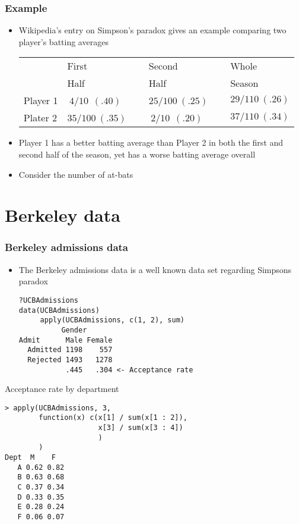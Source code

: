 \documentclass[aspectratio=169]{beamer}
\begin{document}
\begin{frame}\frametitle{Example}
\begin{itemize}
\item Wikipedia's entry on Simpson's paradox gives an example
  comparing two player's batting averages
  \begin{center}
    \ttfamily
    \small
    \begin{tabular}{llll} 
               & First             & Second             & Whole  \\
               & Half              & Half               & Season \\ \hline
      Player 1 & $~4 / 10 ~~(.40)$ ~~& $25 / 100 ~(.25)$ ~~& $29 / 110 ~(.26)$ \\
      Plater 2 & $35 / 100 ~(.35)$ ~~& $~2 / 10~ ~(.20)$ ~~& $37 / 110 ~(.34)$ \\ \hline 
    \end{tabular}
    \normalfont
  \end{center}
\item Player 1 has a better batting average than Player 2 in both the
  first and second half of the season, yet has a worse batting average
  overall
\item Consider the number of at-bats 
\end{itemize}
\end{frame}

\section{Berkeley data}
\begin{frame}[fragile]\frametitle{Berkeley admissions data}
\begin{itemize}
\item The Berkeley admissions data is a well known data set regarding Simpsons paradox
\begin{verbatim}
?UCBAdmissions
data(UCBAdmissions)
     apply(UCBAdmissions, c(1, 2), sum)
          Gender
Admit      Male Female
  Admitted 1198    557
  Rejected 1493   1278
           .445   .304 <- Acceptance rate
\end{verbatim}
\end{itemize}
\end{frame}

\begin{frame}[fragile]
Acceptance rate by department
\begin{verbatim}
> apply(UCBAdmissions, 3, 
        function(x) c(x[1] / sum(x[1 : 2]), 
                      x[3] / sum(x[3 : 4])
                      )
        ) 
Dept  M    F
   A 0.62 0.82
   B 0.63 0.68
   C 0.37 0.34
   D 0.33 0.35
   E 0.28 0.24
   F 0.06 0.07
\end{verbatim}
\end{frame}
\end{document}
